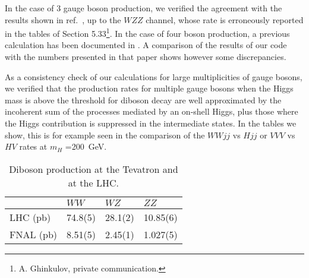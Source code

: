 \documentclass[paper]{JHEP3}
\newcommand{\ccaption}[2]{
    \begin{center}
    \parbox{0.85\textwidth}{
      \caption[#1]{\small{{#2}}}
      }
    \end{center}
    }
\def    \frac           #1#2{{#1 \over #2}}
\def    \mH             {\mbox{$m_H$} }
\begin{document}

In the case of 3 gauge boson production, we verified the agreement
with the results shown in ref.~\cite{Haywood:1999qg}, 
up to the $WZZ$ channel, whose
rate is erroneously reported in the tables of 
Section 5.33\footnote{A. Ghinkulov, private communication.}. In the
case of four boson production, a previous calculation has been
documented in \cite{Barger:1989cp}. A comparison of the results of our
code with the numbers presented in that paper shows however some
discrepancies. 

As a consistency check of our calculations for large multiplicities of
gauge bosons, we verified that the production rates for multiple gauge
bosons when the Higgs mass is above the threshold for diboson decay
are well approximated by the incoherent sum of the processes mediated
by an on-shell Higgs, plus those where the Higgs contribution 
is suppressed in the
intermediate states. In the tables we show, this is for example seen
in the comparison of the $WWjj$ vs $Hjj$ or $VVV$ vs $HV$
 rates at \mH=200~GeV.

{\renewcommand{\arraystretch}{1.2}
\begin{table}
\begin{center}
\begin{tabular}{||l|l|l|l||}\hline
& $WW$ & $WZ$ & $ZZ$ 
                 \\  \hline
LHC (pb)   & 74.8(5) & 28.1(2) & 10.85(6) 
\\ \hline
FNAL (pb)  & 8.51(5) & 2.45(1) & 1.027(5)
\\ \hline
\end{tabular}            
\ccaption{}{\label{tab:wwxs} Diboson production 
at the Tevatron and at the LHC. }
\end{center}
\end{table}}
\end{document}
